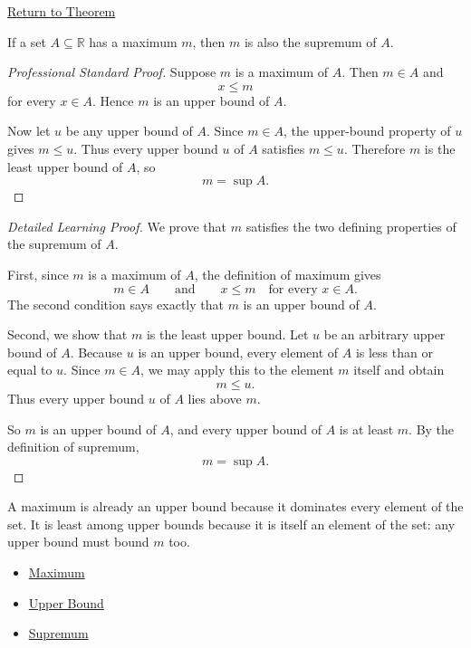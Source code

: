 \newpage
{}
\label{prf:maximum-implies-supremum}

\begin{remark*}[Return]
\hyperref[prop:maximum-implies-supremum]{Return to Theorem}
\end{remark*}


\begin{proposition*}
If a set $A \subseteq \mathbb{R}$ has a maximum $m$, then $m$ is also the supremum of $A$.
\end{proposition*}

\begin{proof}[Professional Standard Proof]
\LRAProofBodyStart
Suppose \(m\) is a maximum of \(A\). Then \(m\in A\) and
\[
x\le m
\]
for every \(x\in A\). Hence \(m\) is an upper bound of \(A\).

Now let \(u\) be any upper bound of \(A\). Since \(m\in A\), the upper-bound
property of \(u\) gives \(m\le u\). Thus every upper bound \(u\) of \(A\)
satisfies \(m\le u\). Therefore \(m\) is the least upper bound of \(A\), so
\[
m=\sup A.
\]
\end{proof}

\begin{proof}[Detailed Learning Proof]
\LRAProofBodyStart
We prove that \(m\) satisfies the two defining properties of the supremum of
\(A\).

First, since \(m\) is a maximum of \(A\), the definition of maximum gives
\[
m\in A
\qquad\text{and}\qquad
x\le m \quad\text{for every }x\in A.
\]
The second condition says exactly that \(m\) is an upper bound of \(A\).

Second, we show that \(m\) is the least upper bound. Let \(u\) be an arbitrary
upper bound of \(A\). Because \(u\) is an upper bound, every element of \(A\)
is less than or equal to \(u\). Since \(m\in A\), we may apply this to the
element \(m\) itself and obtain
\[
m\le u.
\]
Thus every upper bound \(u\) of \(A\) lies above \(m\).

So \(m\) is an upper bound of \(A\), and every upper bound of \(A\) is at least
\(m\). By the definition of supremum,
\[
m=\sup A.
\]
\end{proof}

\begin{remark*}
A maximum is already an upper bound because it dominates every element of the
set. It is least among upper bounds because it is itself an element of the set:
any upper bound must bound \(m\) too.
\end{remark*}

\begin{dependencies}
\begin{itemize}
  \item \hyperref[def:maximum]{Maximum}
  \item \hyperref[def:upper-bound]{Upper Bound}
  \item \hyperref[def:supremum]{Supremum}
\end{itemize}
\end{dependencies}

\clearpage
